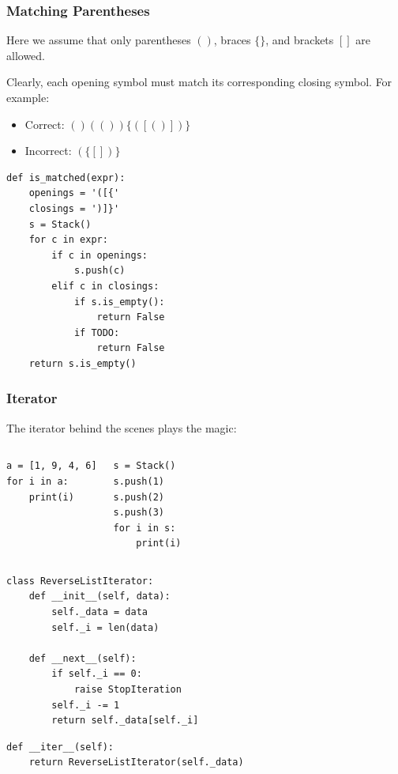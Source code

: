 \documentclass[aspectratio=169, 14pt]{beamer}
\begin{document}
\begin{frame}
    \frametitle{Matching Parentheses}

    Here we assume that only parentheses $()$, braces $\{\}$, and brackets $[]$ are allowed.

    Clearly, each opening symbol must match its corresponding closing symbol. For example:

    \begin{itemize}
        \item Correct: $()(())\{([()])\}$
        \item Incorrect: $(\{[])\}$
    \end{itemize}

\end{frame}

\begin{frame}[fragile]
    \begin{verbatim}
def is_matched(expr):
    openings = '([{'
    closings = ')]}'
    s = Stack()
    for c in expr:
        if c in openings:
            s.push(c)
        elif c in closings:
            if s.is_empty():
                return False
            if TODO:
                return False
    return s.is_empty()
    \end{verbatim}  

\end{frame}

\begin{frame}[fragile]
    \frametitle{Iterator}
    The \alert{iterator} behind the scenes plays the magic:

    \begin{columns}
        \begin{verbatim}
a = [1, 9, 4, 6]
for i in a:
    print(i)    
    \end{verbatim}
        \begin{verbatim}
s = Stack()
s.push(1)
s.push(2)
s.push(3)
for i in s:
    print(i)
    \end{verbatim}

    \end{columns}
\end{frame}

\begin{frame}[fragile]
    \begin{verbatim}
class ReverseListIterator:
    def __init__(self, data):
        self._data = data
        self._i = len(data)

    def __next__(self):
        if self._i == 0:
            raise StopIteration
        self._i -= 1
        return self._data[self._i]  
    \end{verbatim}

        \begin{verbatim}
def __iter__(self):
    return ReverseListIterator(self._data)        
        \end{verbatim}

\end{frame}
\end{document}

